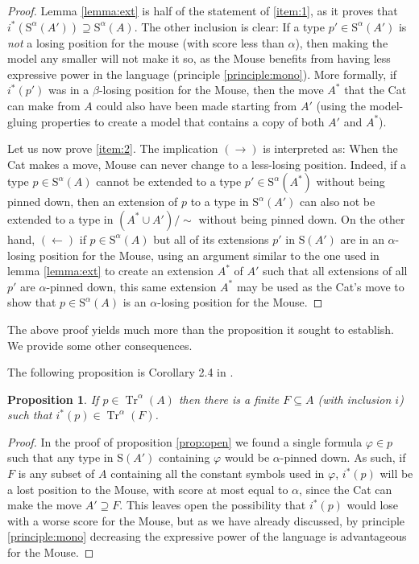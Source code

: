 \documentclass{article}
\newtheorem{prop}[theorem]{Proposition}
\theoremstyle{nonumberplain}
\newtheorem{proof}{Proof}
\newcommand{\Stone}{\mathrm{S}}
\DeclareMathOperator{\Tr}{Tr}
\begin{document}
\begin{proof}
Lemma \ref{lemma:ext} is half of the statement of \ref{item:1}, as it proves that $i^*(\Stone^\alpha(A')) \supseteq \Stone^\alpha(A)$. The other inclusion is clear: If a type $p' \in \Stone^\alpha(A')$ is \emph{not} a losing position for the mouse (with score less than $\alpha$), then making the model any smaller will not make it so, as the Mouse benefits from having less expressive power in the language (principle \ref{principle:mono}). More formally, if $i^*(p')$ was in a $\beta$-losing position for the Mouse, then the move $A^*$ that the Cat can make from $A$ could also have been made starting from $A'$ (using the model-gluing properties to create a model that contains a copy of both $A'$ and $A^*$).

Let us now prove \ref{item:2}. The implication $(\rightarrow)$ is interpreted as: When the Cat makes a move, Mouse can never change to a less-losing position. Indeed, if a type $p \in \Stone^\alpha(A)$ cannot be extended to a type $p' \in \Stone^\alpha(A^*)$ without being pinned down, then an extension of $p$ to a type in $\Stone^\alpha(A')$ can also not be extended to a type in $(A^* \cup A')/\sim$ without being pinned down. On the other hand, $(\leftarrow)$ if $p \in \Stone^\alpha(A)$ but all of its extensions $p'$ in $\Stone(A')$ are in an $\alpha$-losing position for the Mouse, using an argument similar to the one used in lemma \ref{lemma:ext} to create an extension $A^*$ of $A'$ such that all extensions of all $p'$ are $\alpha$-pinned down, this same extension $A^*$ may be used as the Cat's move to show that $p \in \Stone^\alpha(A)$ is an $\alpha$-losing position for the Mouse.
\end{proof}

The above proof yields much more than the proposition it sought to establish. We provide some other consequences.

The following proposition is Corollary 2.4 in \cite{morley}.

\begin{prop}\label{prop:f}
If $p \in \Tr^\alpha(A)$ then there is a finite $F \subseteq A$ (with inclusion $i$) such that $i^*(p) \in \Tr^\alpha(F)$.
\end{prop}

\begin{proof}
In the proof of proposition \ref{prop:open} we found a single formula $\varphi \in p$ such that any type in $\Stone(A')$ containing $\varphi$ would be $\alpha$-pinned down. As such, if $F$ is any subset of $A$ containing all the constant symbols used in $\varphi$, $i^*(p)$ will be a lost position to the Mouse, with score at most equal to $\alpha$, since the Cat can make the move $A' \supseteq F$. This leaves open the possibility that $i^*(p)$ would lose with a worse score for the Mouse, but as we have already discussed, by principle \ref{principle:mono} decreasing the expressive power of the language is advantageous for the Mouse.
\end{proof}
\end{document}
